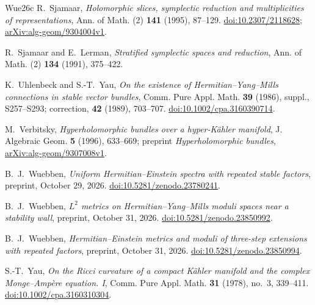 \begin{thebibliography}{Wue26c}
R.~Sjamaar, \textit{Holomorphic slices, symplectic reduction and multiplicities
of representations}, Ann. of Math. (2) \textbf{141} (1995), 87--129.
\href{https://doi.org/10.2307/2118628}{doi:10.2307/2118628};
\href{https://arxiv.org/abs/alg-geom/9304004v1}{arXiv:alg-geom/9304004v1}.

R.~Sjamaar and E.~Lerman, \textit{Stratified symplectic spaces and reduction},
Ann. of Math. (2) \textbf{134} (1991), 375--422.

K.~Uhlenbeck and S.-T.~Yau,
\textit{On the existence of Hermitian--Yang--Mills connections in stable
vector bundles}, Comm. Pure Appl. Math. \textbf{39} (1986), suppl.,
S257--S293; correction, \textbf{42} (1989), 703--707.
\href{https://doi.org/10.1002/cpa.3160390714}{doi:10.1002/cpa.3160390714}.

M.~Verbitsky, \textit{Hyperholomorphic bundles over a hyper-K\"ahler manifold},
J. Algebraic Geom. \textbf{5} (1996), 633--669;
preprint \textit{Hyperholomorphic bundles},
\href{https://arxiv.org/abs/alg-geom/9307008v1}{arXiv:alg-geom/9307008v1}.

B.~J.~Wuebben, \textit{Uniform Hermitian--Einstein spectra with repeated
stable factors}, preprint, October 29, 2026.
\href{https://doi.org/10.5281/zenodo.23780241}{doi:10.5281/zenodo.23780241}.

B.~J.~Wuebben, \textit{$L^2$ metrics on Hermitian--Yang--Mills moduli
spaces near a stability wall}, preprint, October 31, 2026.
\href{https://doi.org/10.5281/zenodo.23850992}{doi:10.5281/zenodo.23850992}.

B.~J.~Wuebben, \textit{Hermitian--Einstein metrics and moduli of three-step
extensions with repeated factors}, preprint, October 31, 2026.
\href{https://doi.org/10.5281/zenodo.23850994}{doi:10.5281/zenodo.23850994}.

S.-T.~Yau, \textit{On the Ricci curvature of a compact K\"ahler manifold
and the complex Monge--Amp\`ere equation. I},
Comm. Pure Appl. Math. \textbf{31} (1978), no.~3, 339--411.
\href{https://doi.org/10.1002/cpa.3160310304}{doi:10.1002/cpa.3160310304}.
\end{thebibliography}
